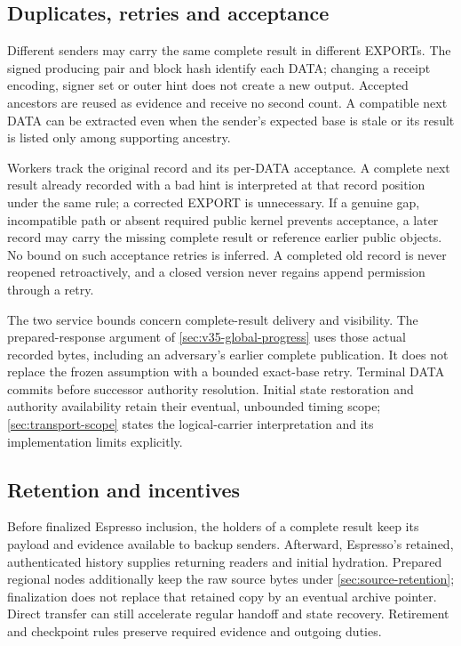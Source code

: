 \documentclass[11pt,a4paper]{article}
\begin{document}
\subsection{Duplicates, retries and acceptance}
Different senders may carry the same complete result in different EXPORTs.
The signed producing pair and block hash identify each DATA; changing a
receipt encoding, signer set or outer hint does not create a new output.
Accepted ancestors are reused as evidence and receive no second count.
A compatible next DATA can be extracted even when the sender's expected
base is stale or its result is listed only among supporting ancestry.

Workers track the original record and its per-DATA acceptance. A complete
next result already recorded with a bad hint is interpreted at that
record position under the same rule; a corrected EXPORT is unnecessary.
If a genuine gap, incompatible path or absent required public kernel prevents
acceptance, a later record may carry the missing complete result or
reference earlier public objects. No bound on such acceptance retries
is inferred. A completed old record is never reopened retroactively,
and a closed version never regains append permission through a retry.

The two service bounds concern complete-result delivery and visibility.
The prepared-response argument of \cref{sec:v35-global-progress} uses
those actual recorded bytes, including an adversary's earlier complete
publication. It does not replace the frozen assumption with a bounded
exact-base retry. Terminal DATA commits before successor authority
resolution. Initial state restoration and authority availability retain
their eventual, unbounded timing scope; \cref{sec:transport-scope} states
the logical-carrier interpretation and its implementation limits explicitly.

\subsection{Retention and incentives}
Before finalized Espresso inclusion, the holders of a complete result
keep its payload and evidence available to backup senders. Afterward,
Espresso's retained, authenticated history supplies returning readers and
initial hydration. Prepared regional nodes additionally keep the raw
source bytes under \cref{sec:source-retention}; finalization does not
replace that retained copy by an eventual archive pointer. Direct transfer
can still accelerate regular handoff and state recovery. Retirement and
checkpoint rules preserve required evidence and outgoing duties.
\end{document}

